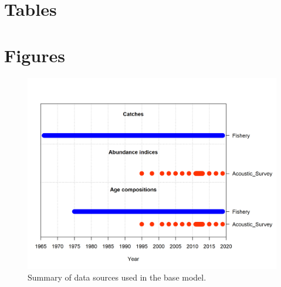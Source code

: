 \documentclass[11pt,
  english,
  a4paper,
]{article}
\begin{document}
\clearpage


\hypertarget{tables}{%
\section{Tables}\label{tables}}

\leavevmode\tagmcend\tagstructend

\clearpage


\hypertarget{figures}{%
\section{Figures}\label{figures}}

\leavevmode\tagmcend\tagstructend


\begin{figure}
\centering
\includegraphics[width=1\textwidth,height=1\textheight]{data-plot.png}
\caption{Summary of data sources used in the base model.\label{fig:data-plot}}
\end{figure}

\tagmcend\tagstructend
\end{document}
